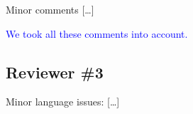 \documentclass[11pt]{article}
\newcommand{\answer}[1]{\textcolor{blue}{#1}\vspace*{1em}}
\begin{document}
Minor comments […]
% 
% 

\answer{
We took all these comments into account.
}



\subsection*{Reviewer \#3}

Minor language issues: […]

\end{document}
